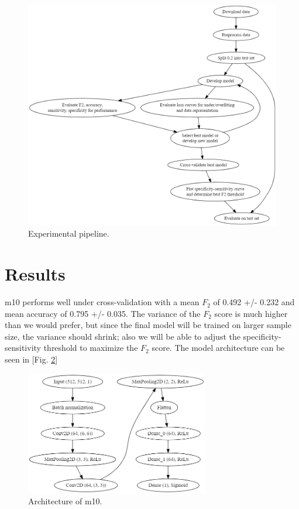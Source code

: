 \documentclass{article}
\begin{document}
\begin{figure}[]
    \centering
    \includegraphics[width=14cm]{pipeline}
    \caption{Experimental pipeline.}
    \label{fig:pipeline}
\end{figure}
    
\clearpage
\section{Results}

    m10 performs well under cross-validation with a mean $F_2$ of 0.492 +/- 0.232 and mean accuracy of 0.795 +/- 0.035. The variance of the $F_2$ score is much higher than we would prefer, but since the final model will be trained on larger sample size, the variance should shrink; also we will be able to adjust the specificity-sensitivity threshold to maximize the $F_2$ score. The model architecture can be seen in [Fig. \ref{fig:architecture}]
    
\begin{figure}[]
    \centering
    \includegraphics[width=8cm]{architecture}
    \caption{Architecture of m10.}
    \label{fig:architecture}
\end{figure}
    
\end{document}
